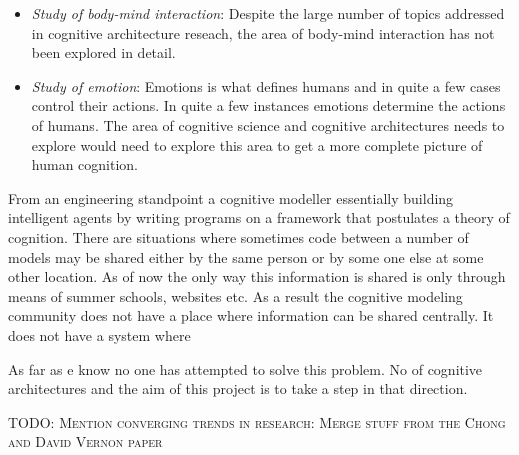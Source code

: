 \begin{itemize}
\item \emph{Study of body-mind interaction}: Despite the large number
  of topics addressed in cognitive architecture reseach, the area of
  body-mind interaction has not been explored in detail.


\item \emph{Study of emotion}: Emotions is what defines humans and in
  quite a few cases control their actions. In quite a few instances
  emotions determine the actions of humans. The area of cognitive
  science and cognitive architectures needs to explore would need to
  explore this area to get a more complete picture of human cognition.



\end{itemize}


From an engineering standpoint a cognitive modeller essentially
building intelligent agents by writing programs on a framework that
postulates a theory of cognition. There are situations where sometimes
code between a number of models may be shared either by the same
person or by some one else at some other location. As of now the only
way this information is shared is only through means of summer
schools, websites etc. As a result the cognitive modeling community
does not have a place where information can be shared centrally. It
does not have a system where 


As far as e know no one has attempted to solve this problem. No of
cognitive architectures and the aim of this project is to take a step
in that direction.


\textsc{TODO: Mention converging trends in research: Merge stuff from
  the Chong and David Vernon paper}